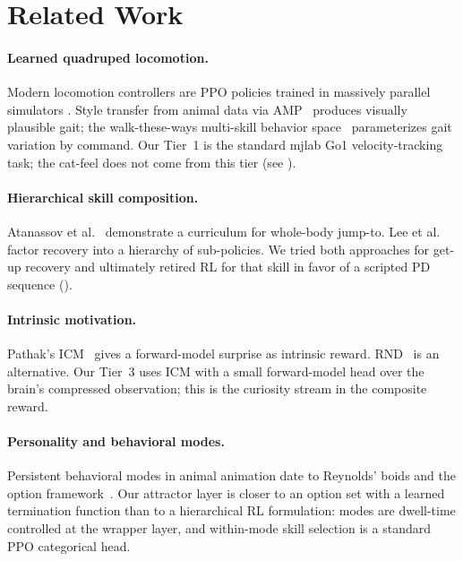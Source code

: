 \documentclass[11pt]{article}
\begin{document}
\section{Related Work}

\paragraph{Learned quadruped locomotion.}
Modern locomotion controllers are PPO policies trained in massively
parallel simulators \cite{rudin2022parallel}. Style transfer from animal
data via AMP~\cite{peng2021amp} produces visually plausible gait; the
walk-these-ways multi-skill behavior space~\cite{margolis2023wtw}
parameterizes gait variation by command. Our Tier~1 is the standard
mjlab Go1 velocity-tracking task; the cat-feel does not come from this
tier (see ).

\paragraph{Hierarchical skill composition.}
Atanassov et al.~\cite{atanassov2024curriculum} demonstrate a curriculum
for whole-body jump-to. Lee et al.~\cite{lee2019recovery} factor recovery
into a hierarchy of sub-policies. We tried both approaches for get-up
recovery and ultimately retired RL for that skill in favor of a scripted
PD sequence ().

\paragraph{Intrinsic motivation.}
Pathak's ICM~\cite{pathak2017curiosity} gives a forward-model surprise as
intrinsic reward. RND~\cite{burda2019rnd} is an alternative. Our Tier~3
uses ICM with a small forward-model head over the brain's compressed
observation; this is the curiosity stream in the composite reward.

\paragraph{Personality and behavioral modes.}
Persistent behavioral modes in animal animation date to Reynolds' boids
\cite{reynolds1987boids} and the option framework~\cite{sutton1999options}.
Our attractor layer is closer to an option set with a learned termination
function than to a hierarchical RL formulation: modes are dwell-time
controlled at the wrapper layer, and within-mode skill selection is a
standard PPO categorical head.
\end{document}
